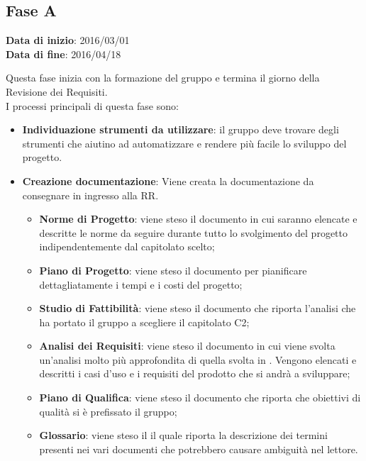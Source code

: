 	\subsection{Fase A}
	\begin{center}
		\textbf{Data di inizio}: 2016/03/01 \\
		\textbf{Data di fine}: 2016/04/18 \\
	\end{center}

	Questa fase inizia con la formazione del gruppo e termina il giorno della Revisione dei Requisiti. \\
	I processi principali di questa fase sono: 
	\begin{itemize}
		\item \textbf{Individuazione strumenti da utilizzare}: il gruppo deve trovare degli strumenti che aiutino ad automatizzare e rendere più facile lo sviluppo del progetto.
		\item \textbf{Creazione documentazione}: Viene creata la documentazione da consegnare in ingresso alla RR.
		\att
		\begin{itemize}
			\item \textbf{Norme di Progetto}: viene steso il documento \NPdoc in cui saranno elencate e descritte le norme da seguire durante tutto lo svolgimento del progetto indipendentemente dal capitolato scelto;
			\item \textbf{Piano di Progetto}: viene steso il documento \PPdoc per pianificare dettagliatamente i tempi e i costi del progetto;
			\item \textbf{Studio di Fattibilità}: viene steso il documento \SFdoc che riporta l'analisi che ha portato il gruppo a scegliere il capitolato C2;
			\item \textbf{Analisi dei Requisiti}: viene steso il documento \ARdoc in cui viene svolta un'analisi molto più approfondita di quella svolta in \SFdoc. Vengono elencati e descritti i casi d'uso e i requisiti del prodotto che si andrà a sviluppare;
			\item \textbf{Piano di Qualifica}: viene steso il documento \PQdoc che riporta che obiettivi di qualità si è prefissato il gruppo;
			\item \textbf{Glossario}: viene steso il \Gldoc il quale riporta la descrizione dei termini presenti nei vari documenti che potrebbero causare ambiguità nel lettore.
		\end{itemize}
	\end{itemize}
	
